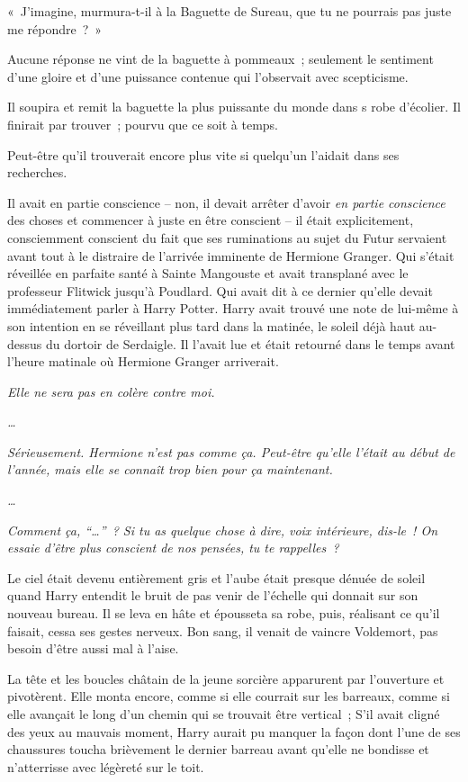 «~J'imagine, murmura-t-il à la Baguette de Sureau, que tu ne pourrais pas juste me répondre~?~»

Aucune réponse ne vint de la baguette à pommeaux~; seulement le sentiment d'une gloire et d'une puissance contenue qui l'observait avec scepticisme.

Il soupira et remit la baguette la plus puissante du monde dans s robe d'écolier.
Il finirait par trouver~; pourvu que ce soit à temps.

Peut-être qu'il trouverait encore plus vite si quelqu'un l'aidait dans ses recherches.

Il avait en partie conscience -- non, il devait arrêter d'avoir \emph{en partie conscience} des choses et commencer à juste en être conscient -- il était explicitement, consciemment conscient du fait que ses ruminations au sujet du Futur servaient avant tout à le distraire de l'arrivée imminente de Hermione Granger.
Qui s'était réveillée en parfaite santé à Sainte Mangouste et avait transplané avec le professeur Flitwick jusqu'à Poudlard.
Qui avait dit à ce dernier qu'elle devait immédiatement parler à Harry Potter.
Harry avait trouvé une note de lui-même à son intention en se réveillant plus tard dans la matinée, le soleil déjà haut au-dessus du dortoir de Serdaigle.
Il l'avait lue et était retourné dans le temps avant l'heure matinale où Hermione Granger arriverait.

\emph{Elle ne sera pas en colère contre moi.}

\emph{…}

\emph{Sérieusement.
Hermione n'est pas comme ça.
Peut-être qu'elle l'était au début de l'année, mais elle se connaît trop bien pour ça maintenant.}

\emph{…}

\emph{Comment ça, “…”~?
Si tu as quelque chose à dire, voix intérieure, dis-le~!
On essaie d'être plus conscient de nos pensées, tu te rappelles~?}

\later

Le ciel était devenu entièrement gris et l'aube était presque dénuée de soleil quand Harry entendit le bruit de pas venir de l'échelle qui donnait sur son nouveau bureau.
Il se leva en hâte et épousseta sa robe, puis, réalisant ce qu'il faisait, cessa ses gestes nerveux.
Bon sang, il venait de vaincre Voldemort, pas besoin d'être aussi mal à l'aise.

La tête et les boucles châtain de la jeune sorcière apparurent par l'ouverture et pivotèrent.
Elle monta encore, comme si elle courrait sur les barreaux, comme si elle avançait le long d'un chemin qui se trouvait être vertical~; S'il avait cligné des yeux au mauvais moment, Harry aurait pu manquer la façon dont l'une de ses chaussures toucha brièvement le dernier barreau avant qu'elle ne bondisse et n'atterrisse avec légèreté sur le toit.

